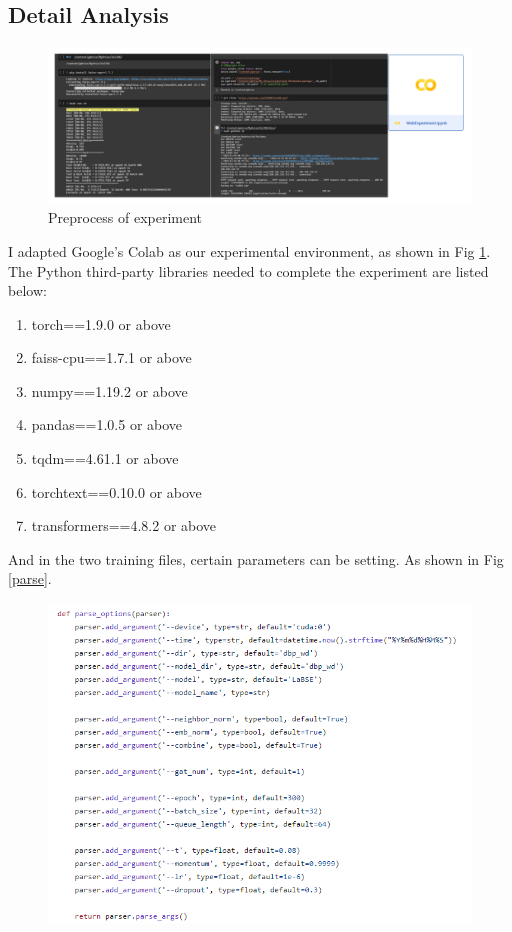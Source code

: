 \documentclass[sigconf]{acmart}
\begin{document}
{\subsection{Detail Analysis}
\begin{figure}[h]
    \centering
    \includegraphics[width=1\linewidth]{figure/code.png}
    \caption{Preprocess of experiment}
    \label{code}
\end{figure}
I adapted Google's Colab as our experimental environment, as shown in Fig \ref{code}. The Python third-party libraries needed to complete the experiment are listed below:
\begin{enumerate}
    \item  torch==1.9.0 or above
    \item  faiss-cpu==1.7.1 or above
    \item  numpy==1.19.2 or above
    \item  pandas==1.0.5 or above
    \item  tqdm==4.61.1 or above
    \item  torchtext==0.10.0 or above
    \item  transformers==4.8.2 or above
\end{enumerate}
And in the two training files, certain parameters can be setting. As shown in Fig \ref{parse}.
\begin{figure}
    \centering
    \includegraphics[width=1\linewidth]{figure/parse.png}

\end{figure}}
\end{document}
